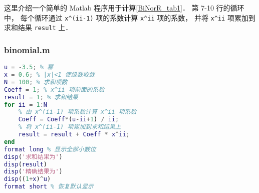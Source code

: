 
这里介绍一个简单的 Matlab 程序用于计算\autoref{BiNorR_tab1}． 第 7-10 行的循环中， 每个循环通过 \lstinline|x^(ii-1)| 项的系数计算 \lstinline|x^ii| 项的系数， 并将 \lstinline|x^ii| 项累加到求和结果 \lstinline|result| 上．

\subsubsection{binomial.m}
\begin{lstlisting}[language=matlab]
% 验证二项式定理(非整数幂)
u = -3.5; % 幂
x = 0.6; % |x|<1 使级数收敛
N = 100; % 求和项数
Coeff = 1; % x^ii 项前面的系数
result = 1; % 求和结果
for ii = 1:N
    % 由 x^(ii-1) 项系数计算 x^ii 项系数
    Coeff = Coeff*(u-ii+1) / ii; 
    % 将 x^(ii-1) 项累加到求和结果上
    result = result + Coeff * x^ii; 
end
format long % 显示全部小数位
disp('求和结果为')
disp(result)
disp('精确结果为')
disp((1+x)^u)
format short % 恢复默认显示
\end{lstlisting}
